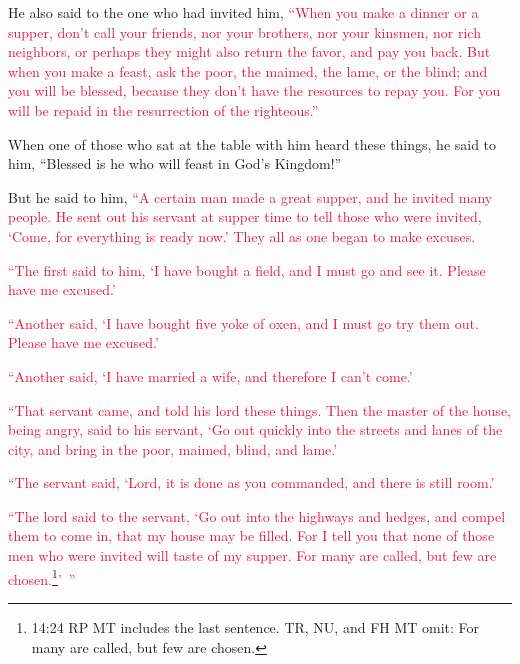 \myverse{}He also said to the one who had invited him,
\textcolor{crimson}{“When you make a dinner or a supper, don’t call your friends, nor your brothers, nor your kinsmen,
	nor rich neighbors, or perhaps they might also return the favor, and pay you back.
}
\myverse{}\textcolor{crimson}{But when you make a feast, ask the poor, the maimed, the lame, or the
	blind;
}
\myverse{}\textcolor{crimson}{and you will be blessed, because they don’t have the resources to repay
	you. For you will be repaid in the resurrection of the righteous.”
}

\myverse{}When one of those who sat at the table with him heard these
things, he said to him, “Blessed is he who will feast in God’s Kingdom!”

\myverse{}But he said to him,
\textcolor{crimson}{“A certain man made a great supper, and he invited many people.
}
\myverse{}\textcolor{crimson}{He sent out his servant at supper time to tell those who were invited,
	‘Come, for everything is ready now.’
}
\myverse{}\textcolor{crimson}{They all as one began to make excuses.}

\textcolor{crimson}{“The first said to him, ‘I have bought a field, and I must go and see it. Please have
	me excused.’}

\myverse{}\textcolor{crimson}{“Another said, ‘I have bought five yoke of oxen, and I must
	go try them out. Please have me excused.’}

\myverse{}\textcolor{crimson}{“Another said, ‘I have married a wife, and therefore I can’t
	come.’
}

\myverse{}\textcolor{crimson}{“That servant came, and told his lord these things. Then
	the master of the house, being angry, said to his servant, ‘Go out quickly into the streets and lanes
	of the city, and bring in the poor, maimed, blind, and lame.’}

\myverse{}\textcolor{crimson}{“The servant said, ‘Lord, it is done as you commanded, and
	there is still room.’}

\myverse{}\textcolor{crimson}{“The lord said to the servant, ‘Go out into the highways
	and hedges, and compel them to come in, that my house may be filled.
}
\myverse{}\textcolor{crimson}{For I tell you that none of those men who were invited will taste of
	my supper. For many are called, but few are chosen.}\footnote{14:24 RP MT includes the last sentence. TR, NU, and FH MT omit: For many are called, but few are chosen.}\textcolor{crimson}{’ ”}

